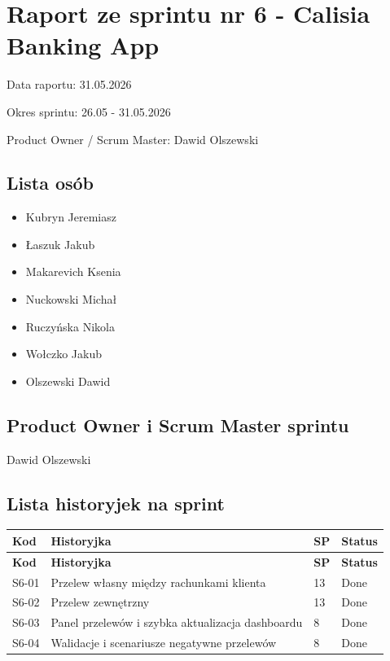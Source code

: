 \documentclass[12pt,a4paper]{article}
\begin{document}
\section*{Raport ze sprintu nr 6 - Calisia Banking App}
Data raportu: 31.05.2026

Okres sprintu: 26.05 - 31.05.2026

Product Owner / Scrum Master: Dawid Olszewski

\subsection*{Lista osób}
\begin{itemize}
\item Kubryn Jeremiasz
\item Łaszuk Jakub
\item Makarevich Ksenia
\item Nuckowski Michał
\item Ruczyńska Nikola
\item Wołczko Jakub
\item Olszewski Dawid
\end{itemize}

\subsection*{Product Owner i Scrum Master sprintu}
Dawid Olszewski

\subsection*{Lista historyjek na sprint}
\begingroup
\footnotesize
{}
\begin{longtable}{@{}C{0.08\textwidth}L{0.62\textwidth}C{0.10\textwidth}L{0.12\textwidth}@{}}
\toprule
{}
\textbf{Kod} & \textbf{Historyjka} & \textbf{SP} & \textbf{Status} \\
\midrule
\endfirsthead
\toprule
{}
\textbf{Kod} & \textbf{Historyjka} & \textbf{SP} & \textbf{Status} \\
\midrule
\endhead
S6-01 & Przelew własny między rachunkami klienta & 13 & Done \\
S6-02 & Przelew zewnętrzny & 13 & Done \\
S6-03 & Panel przelewów i szybka aktualizacja dashboardu & 8 & Done \\
S6-04 & Walidacje i scenariusze negatywne przelewów & 8 & Done \\
\bottomrule
\end{longtable}
\endgroup
\end{document}
